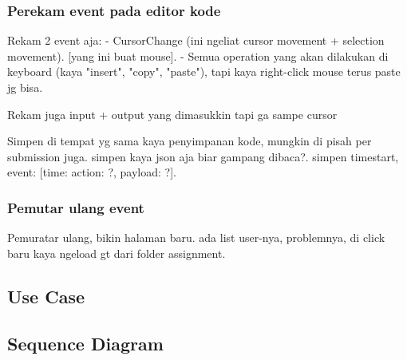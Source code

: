 
\subsubsection{Perekam event pada editor kode}
\label{sec:3:2:1:rekam}

Rekam 2 event aja:
- CursorChange (ini ngeliat cursor movement + selection movement). [yang ini buat mouse].
- Semua operation yang akan dilakukan di keyboard (kaya "insert", "copy", "paste"), tapi kaya right-click mouse terus paste jg bisa.

Rekam juga input + output yang dimasukkin tapi ga sampe cursor

Simpen di tempat yg sama kaya penyimpanan kode, mungkin di pisah per submission juga. simpen kaya json aja biar gampang dibaca?. simpen timestart, event: [time: {action: ?, payload: ?}].
% 

\subsubsection{Pemutar ulang event}
\label{sec:3:2:1:pemutarulang}

Pemuratar ulang, bikin halaman baru. ada list user-nya, problemnya, di click baru kaya ngeload gt dari folder assignment.

\subsection{Use Case}
\label{sec:3:2:usecase}

\subsection{Sequence Diagram}
\label{sec:3:2:seqdiagram}